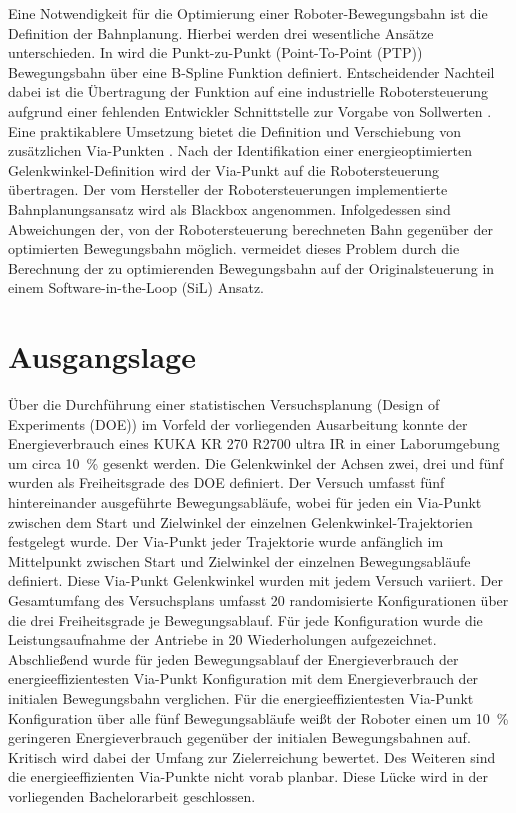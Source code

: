 Eine Notwendigkeit für die Optimierung einer Roboter-Bewegungsbahn ist die Definition der Bahnplanung. Hierbei werden drei wesentliche Ansätze unterschieden. In \cite{Hansen.2012} wird die Punkt-zu-Punkt (Point-To-Point (PTP)) Bewegungsbahn über eine B-Spline Funktion definiert. Entscheidender Nachteil dabei ist die Übertragung der Funktion auf eine industrielle Robotersteuerung aufgrund einer fehlenden Entwickler Schnittstelle zur Vorgabe von Sollwerten \cite[S.~55~f.]{Eggers.2019}. Eine praktikablere Umsetzung bietet die Definition und Verschiebung von zusätzlichen Via-Punkten \cite[S.~261~ff.]{Spong.2020}. Nach der Identifikation einer energieoptimierten Gelenkwinkel-Definition wird der Via-Punkt auf die Robotersteuerung übertragen. Der vom Hersteller der Robotersteuerungen implementierte Bahnplanungsansatz wird als Blackbox angenommen. Infolgedessen sind Abweichungen der, von der Robotersteuerung berechneten Bahn gegenüber der optimierten Bewegungsbahn möglich. \cite{Eggers.2019} vermeidet dieses Problem durch die Berechnung der zu optimierenden Bewegungsbahn auf der Originalsteuerung in einem Software-in-the-Loop (SiL) Ansatz. 
%
\section{Ausgangslage}
Über die Durchführung einer statistischen Versuchsplanung (Design of Experiments (DOE)) im Vorfeld der vorliegenden Ausarbeitung konnte der Energieverbrauch eines KUKA KR 270 R2700 ultra IR in einer Laborumgebung um circa 10~\% gesenkt werden. Die Gelenkwinkel der Achsen zwei, drei und fünf wurden als Freiheitsgrade des DOE definiert. Der Versuch umfasst fünf hintereinander ausgeführte Bewegungsabläufe, wobei für jeden ein Via-Punkt zwischen dem Start und Zielwinkel der einzelnen Gelenkwinkel-Trajektorien festgelegt wurde. Der Via-Punkt jeder Trajektorie wurde anfänglich im Mittelpunkt zwischen Start und Zielwinkel der einzelnen Bewegungsabläufe definiert. Diese Via-Punkt Gelenkwinkel wurden mit jedem Versuch variiert. Der Gesamtumfang des Versuchsplans umfasst 20 randomisierte Konfigurationen über die drei Freiheitsgrade je Bewegungsablauf. Für jede Konfiguration wurde die Leistungsaufnahme der Antriebe in 20 Wiederholungen aufgezeichnet. Abschließend wurde für jeden Bewegungsablauf der Energieverbrauch der energieeffizientesten Via-Punkt Konfiguration mit dem Energieverbrauch der initialen Bewegungsbahn verglichen. Für die energieeffizientesten Via-Punkt Konfiguration über alle fünf Bewegungsabläufe weißt der Roboter  einen um 10~\% geringeren Energieverbrauch gegenüber der initialen Bewegungsbahnen auf. Kritisch wird dabei der Umfang zur Zielerreichung bewertet. Des Weiteren sind die energieeffizienten Via-Punkte nicht vorab planbar. Diese Lücke wird in der vorliegenden Bachelorarbeit geschlossen.
%
